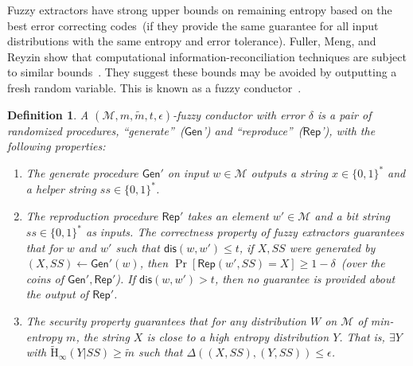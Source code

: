 \documentclass[11pt]{article}
\newcommand{\class}[1]{{\ensuremath{\mathsf{#1}}}}
\newcommand{\gen}{\ensuremath{\class{Gen}}\xspace}
\newcommand{\rep}{\ensuremath{\class{Rep}}\xspace}
\newcommand{\zo}{\ensuremath{\{0, 1\}}}
\newcommand{\dis}{\ensuremath{\mathsf{dis}}}
\newcommand{\Hav}{\tilde{\mathrm{H}}_\infty}
\newtheorem{definition}[theorem]{Definition}
\begin{document}
\label{sec:conductors}
Fuzzy extractors  have strong upper bounds on remaining entropy based on the best error correcting codes~(if they provide the same guarantee for all input distributions with the same entropy and error tolerance).  Fuller, Meng, and Reyzin show that computational information-reconciliation techniques are subject to similar bounds~\cite{fuller2013computational}.  They suggest these bounds may be avoided by outputting a fresh random variable.  This is known as a fuzzy conductor~\cite{KanukurthiR09}.
\begin{definition}
A $(\mathcal{M}, m, \tilde{m}, t, \epsilon)$-\emph{fuzzy conductor} with error $\delta$ is a pair of randomized procedures, ``generate''~(\gen') and ``reproduce''~(\rep'), with the following properties:
\begin{enumerate}
\item The generate procedure $\gen'$ on input $w\in \mathcal{M}$ outputs a string $x\in\zo^*$ and a helper string $ss\in\zo^*$.
\item The reproduction procedure $\rep'$ takes an element $w'\in\mathcal{M}$ and a bit string $ss\in\zo^*$ as inputs.  The \emph{correctness} property of fuzzy extractors guarantees that for $w$ and $w'$ such that $\dis(w, w')\leq t$, if $X, SS$ were generated by $(X, SS)\leftarrow \gen'(w)$, then $\Pr[\rep(w', SS) = X]\geq 1-\delta$~(over the coins of $\gen', \rep'$).  If $\dis(w, w')>t$, then no guarantee is provided about the output of $\rep'$.
\item The security property guarantees that for any distribution $W$ on $\mathcal{M}$ of min-entropy $m$, the string $X$ is close to a high entropy distribution $Y$.  That is, $\exists Y$ with $\Hav(Y | SS ) \geq \tilde{m}$ such that $\Delta((X, SS), (Y, SS))\leq \epsilon$.
\end{enumerate}
\end{definition}
\end{document}
